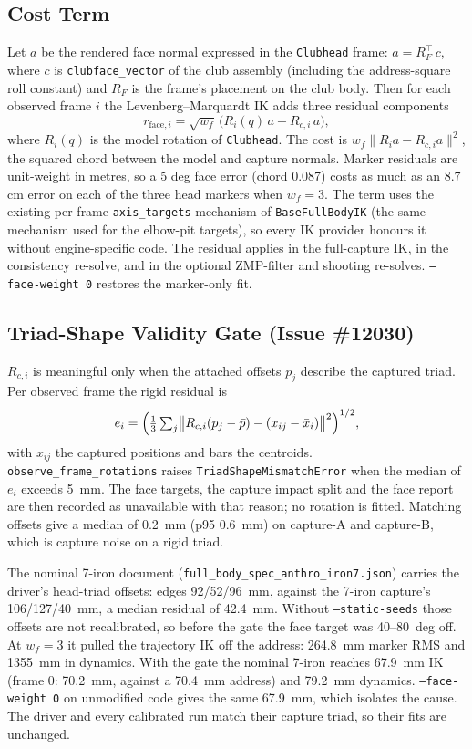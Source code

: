 \documentclass[11pt,a4paper]{article}
\begin{document}
\subsection{Cost Term}
Let $a$ be the rendered face normal expressed in the \texttt{Clubhead} frame:
$a=R_F^{\top}\,c$, where $c$ is \texttt{clubface\_vector} of the club
assembly (including the address-square roll constant) and $R_F$ is the
frame's placement on the club body. Then for each observed frame $i$ the
Levenberg--Marquardt IK adds three residual components
\[
 r_{\mathrm{face},i}=\sqrt{w_f}\,\bigl(R_i(q)\,a-R_{c,i}\,a\bigr),
\]
where $R_i(q)$ is the model rotation of \texttt{Clubhead}. The cost is
$w_f\lVert R_i a-R_{c,i}a\rVert^2$, the squared chord between the model and
capture normals. Marker residuals are unit-weight in metres, so a 5 deg face
error (chord 0.087) costs as much as an 8.7 cm error on each of the three
head markers when $w_f=3$. The term uses the existing per-frame
\texttt{axis\_targets} mechanism of \texttt{BaseFullBodyIK} (the same mechanism
used for the elbow-pit targets), so every IK provider honours it without
engine-specific code. The residual applies in the full-capture IK, in the
consistency re-solve, and in the optional ZMP-filter and shooting re-solves.
\texttt{--face-weight 0} restores the marker-only fit.

\subsection{Triad-Shape Validity Gate (Issue \#12030)}
$R_{c,i}$ is meaningful only when the attached offsets $p_j$ describe the
captured triad. Per observed frame the rigid residual is
\[
 e_i=\Bigl(\tfrac{1}{3}\textstyle\sum_j\bigl\lVert R_{c,i}(p_j-\bar p)-(x_{ij}-\bar x_i)\bigr\rVert^2\Bigr)^{1/2},
\]
with $x_{ij}$ the captured positions and bars the centroids.
\texttt{observe\_frame\_rotations} raises \texttt{TriadShapeMismatchError} when
the median of $e_i$ exceeds 5~mm. The face targets, the capture impact split
and the face report are then recorded as unavailable with that reason; no
rotation is fitted. Matching offsets give a median of 0.2~mm (p95 0.6~mm) on
capture-A and capture-B, which is capture noise on a rigid triad.

The nominal 7-iron document (\texttt{full\_body\_spec\_anthro\_iron7.json})
carries the driver's head-triad offsets: edges 92/52/96~mm, against the
7-iron capture's 106/127/40~mm, a median residual of 42.4~mm. Without
\texttt{--static-seeds} those offsets are not recalibrated, so before the
gate the face target was 40--80~deg off. At $w_f=3$ it pulled the trajectory
IK off the address: 264.8~mm marker RMS and 1355~mm in dynamics. With the
gate the nominal 7-iron reaches 67.9~mm IK (frame 0: 70.2~mm, against a
70.4~mm address) and 79.2~mm dynamics. \texttt{--face-weight 0} on unmodified
code gives the same 67.9~mm, which isolates the cause. The driver and every
calibrated run match their capture triad, so their fits are unchanged.
\end{document}
